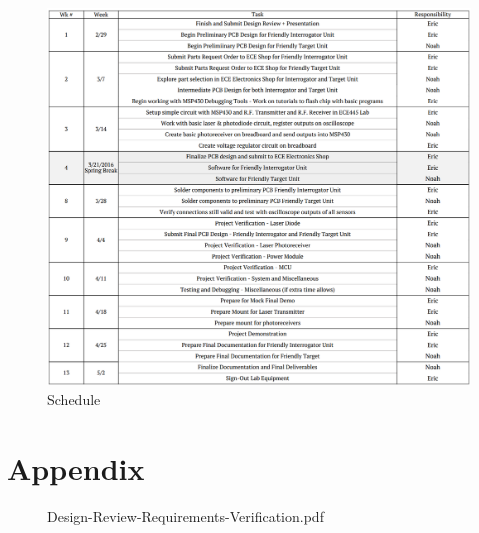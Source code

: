 \documentclass[letterpaper,10pt]{article}
\begin{document}
\begin{spacing}{1.15}
\begin{figure} [H]
	\centering
	\includegraphics[scale=0.63]{Schedule_Extended.png}
	\caption{Schedule\label{fig:extended-schedule}}
\end{figure}


\clearpage

\clearpage
\section*{Appendix}
\begin{figure} [H]
	\centering
	 {Design-Review-Requirements-Verification.pdf}
\end{figure}
\clearpage


\end{spacing}
\end{document}
